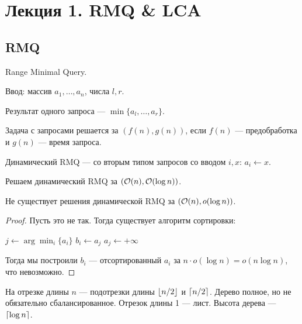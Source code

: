 \section{Лекция 1. RMQ \& LCA}
\subsection{RMQ}
Range Minimal Query.

Ввод:
массив $a_1,\ldots,a_n$,
числа $l, r$.

Результат одного запроса --- $\min\{a_l,\ldots,a_r\}$.

\begin{definition}
    Задача с запросами решается за $(f(n), g(n))$,
    если $f(n)$ --- предобработка
    и $g(n)$ --- время запроса.
\end{definition}

\begin{definition}
    Динамический RMQ ---
    со вторым типом запросов
    со вводом $i, x$:
    $a_i \gets x$.
\end{definition}

Решаем динамический RMQ за $(\mathcal{O}(n), \mathcal{O}(\log n))$.

\begin{theorem}
    Не существует решения динамической RMQ за $(\mathcal{O}(n), o(\log n))$.
\end{theorem}
\begin{proof}
    Пусть это не так.
    Тогда существует алгоритм сортировки:
    \begin{algorithmic}
            \State $j \gets \arg\min_i\{a_i\}$
            \State $b_i \gets a_j$
            \State $a_j \gets +\infty$
        \EndFor
    \end{algorithmic}
    Тогда мы построили $b_i$ --- отсортированный $a_i$
    за $n \cdot o(\log n) = o(n \log n)$,
    что невозможно.
\end{proof}

\begin{definition}
    На отрезке длины $n$ --- подотрезки длины $\left \lfloor n/2 \right \rfloor$ и $\left \lceil n/2 \right \rceil$.
    Дерево полное, но не обязательно сбалансированное.
    Отрезок длины 1 --- лист.
    Высота дерева --- $\left \lceil \log n \right \rceil$.
\end{definition}


